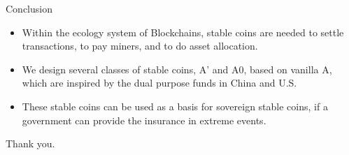 \documentclass[notes=show, beamer, handout]{beamer}
\begin{document}
\begin{frame}{Conclusion}

\begin{itemize}
\item Within the ecology system of Blockchains, stable coins are needed to settle transactions, to pay miners, and to do asset allocation.
\item We design several classes of stable coins, A' and A0, based on vanilla A, which are inspired by the dual purpose funds in China and U.S.
\item These stable coins can be used as a basis for sovereign stable coins, if a government can provide the insurance in extreme events.
\end{itemize}

\end{frame}


\begin{frame}{}
\begin{center}
{\LARGE Thank you.}
\end{center}
\end{frame}
\end{document}
